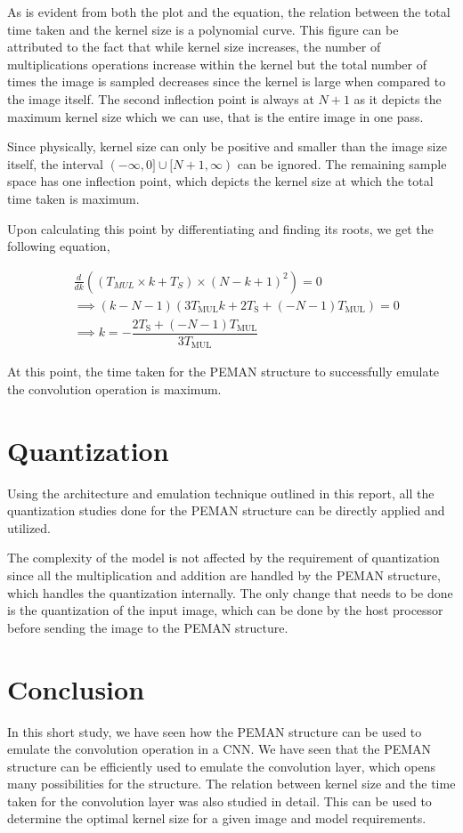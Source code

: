\documentclass[wide]{adonis}
\begin{document}
As is evident from both the plot and the equation, the relation between the total time taken and the kernel size is a polynomial curve. This figure can be attributed to the fact that while kernel size increases, the number of multiplications operations increase within the kernel but the total number of times the image is sampled decreases since the kernel is large when compared to the image itself. The second inflection point is always at $N + 1$ as it depicts the maximum kernel size which we can use, that is the entire image in one pass.

Since physically, kernel size can only be positive and smaller than the image size itself, the interval $(- \infty,0]\cup[N + 1, \infty)$ can be ignored. The remaining sample space has one inflection point, which depicts the kernel size at which the total time taken is maximum.

Upon calculating this point by differentiating and finding its roots, we get the following equation,

\begin{equation}
	\label{eqn:kernel_time_max}
	\begin{split}
		&\frac{d}{dk} \left( (T_{MUL} \times k + T_S) \times (N - k + 1)^2 \right) = 0 \\
		&\implies \left(k-N-1\right)\left(3T_\text{MUL}k+2T_\text{S}+\left(-N-1\right)T_\text{MUL}\right) = 0 \\
		&\implies k = -\dfrac{2T_\text{S}+\left(-N-1\right)T_\text{MUL}}{3T_\text{MUL}}
	\end{split}
\end{equation}

At this point, the time taken for the PEMAN structure to successfully emulate the convolution operation is maximum.

\section{Quantization}

Using the architecture and emulation technique outlined in this report, all the quantization studies done for the PEMAN structure can be directly applied and utilized.

The complexity of the model is not affected by the requirement of quantization since all the multiplication and addition are handled by the PEMAN structure, which handles the quantization internally. The only change that needs to be done is the quantization of the input image, which can be done by the host processor before sending the image to the PEMAN structure.

\section{Conclusion}

In this short study, we have seen how the PEMAN structure can be used to emulate the convolution operation in a CNN. We have seen that the PEMAN structure can be efficiently used to emulate the convolution layer, which opens many possibilities for the structure. The relation between kernel size and the time taken for the convolution layer was also studied in detail. This can be used to determine the optimal kernel size for a given image and model requirements.
\end{document}
